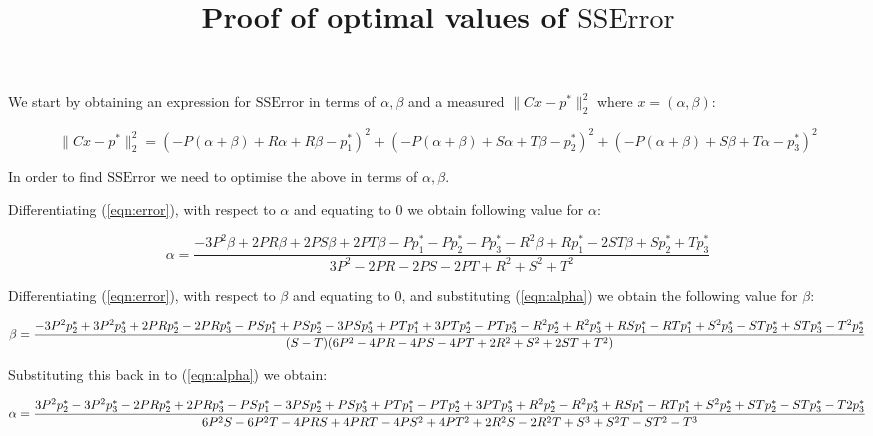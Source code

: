 \documentclass[a4]{article}
\title{Proof of optimal values of \(\text{SSError}\)}
\author{}
\date{}
\begin{document}
\maketitle

We start by obtaining an expression for \(\text{SSError}\) in terms of \(\alpha,
\beta\) and a measured \(\|C x- p^*\|_2^2\) where \(x=(\alpha, \beta)\):

\begin{equation}
 \|C x- p^*\|_2^2 = (-P(\alpha + \beta) + R\alpha + R\beta - p^*_1)^2 +
 (-P(\alpha + \beta) + S\alpha + T\beta - p^*_2)^2 + (-P(\alpha + \beta) +
 S\beta + T\alpha - p^*_3) ^ 2
 \label{eqn:error}
\end{equation}

In order to find \(\text{SSError}\) we need to optimise the above in terms of
\(\alpha, \beta\).

Differentiating (\ref{eqn:error}), with respect to \(\alpha\) and equating to 0
we obtain following value for \(\alpha\):

\begin{equation}
    \alpha = \frac{-3P^2\beta + 2PR\beta + 2PS\beta + 2PT\beta - Pp^*_1 - Pp^*_2
    - Pp^*_3 - R^2\beta + Rp^*_1 - 2ST\beta + Sp^*_2 +
Tp^*_3}{3P^2 - 2PR - 2PS - 2PT + R^2 + S^2 + T^2}
    \label{eqn:alpha}
\end{equation}

Differentiating (\ref{eqn:error}), with respect to \(\beta\) and equating to 0,
and substituting (\ref{eqn:alpha}) we obtain the following value for \(\beta\):

\begin{equation}
    \tiny{
    \beta = \frac{-3P^2p^*_2 + 3P^2p^*_3 + 2PRp^*_2 - 2PRp^*_3 - PSp^*_1 + PSp^*_2
        - 3PSp^*_3 + PTp^*_1 + 3PTp^*_2 - PTp^*_3 - R^2p^*_2 + R^2p^*_3 + RSp^*_1
        - RTp^*_1 + S^2p^*_3 - STp^*_2 + STp^*_3 - T^2p^*_2}{(S - T)(6P^2 - 4PR -
    4PS - 4PT + 2R^2 + S^2 + 2ST + T^2)}
}
    \label{eqn:opt_beta}
\end{equation}

Substituting this back in to (\ref{eqn:alpha}) we obtain:

\begin{equation}
    \tiny
    {
    \alpha = \frac{3P^2p^*_2 - 3P^2p^*_3 - 2PRp^*_2 + 2PRp^*_3 - PSp^*_1 -
        3PSp^*_2 + PSp^*_3 + PTp^*_1 - PTp^*_2 + 3PTp^*_3 + R^2p^*_2 - R^2p^*_3 +
        RSp^*_1 - RTp^*_1 + S^2p^*_2 + STp^*_2 - STp^*_3 - T2p^*_3}{6P^2S - 6P^2T -
    4PRS + 4PRT - 4PS^2 + 4PT^2 + 2R^2S - 2R^2T + S^3 + S^2T - ST^2 - T^3}
}
    \label{eqn:opt_alpha}
\end{equation}
\end{document}
